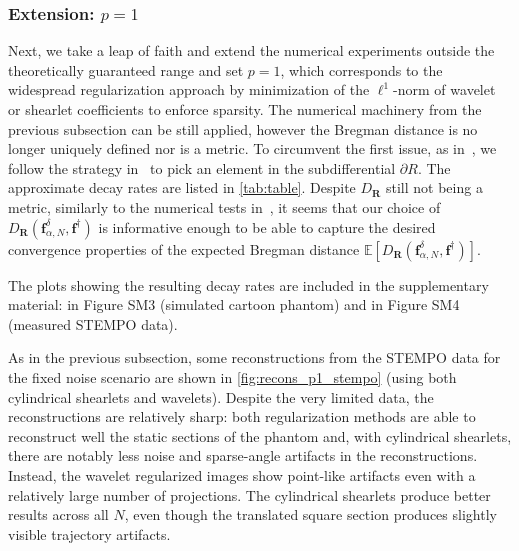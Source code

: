 \documentclass[11pt,a4paper]{article}
\numberwithin{equation}{section}
\renewcommand{\vec}[1]{\boldsymbol{#1}} %
\newcommand{\f}{\vec{f}} %
\newcommand{\faNd}{\f_{\alpha,N}^{\delta}} %
\newcommand{\E}{\mathbb{E}}
\begin{document}
\subsubsection{Extension: \texorpdfstring{$p = 1$}{p = 1}}
Next, we take a leap of faith and extend the numerical experiments outside the theoretically guaranteed range and set $p = 1$, which corresponds to the widespread regularization approach by minimization of the $\ell^1$-norm of wavelet or shearlet coefficients to enforce sparsity. The numerical machinery from the previous subsection can be still applied, however the Bregman distance is no longer uniquely defined nor is a metric. To circumvent the first issue, as in~\cite{Bubba22}, we follow the strategy in~\cite{burger2007error} to pick an element in the subdifferential $\partial R$. 
The approximate decay rates are listed in \cref{tab:table}.
Despite $D_{\vec{R}}$ still not being a metric, similarly to the numerical tests in~\cite{Bubba22}, it seems that our choice of $D_{\vec{R}}(\faNd, \f^\dag)$
is informative enough to be able to capture the desired convergence properties of the expected Bregman distance $\E \left[D_{\vec{R}}(\faNd, \f^\dag) \right]$. 

The plots showing the resulting decay rates are included in the supplementary material: in Figure SM3 %
(simulated cartoon phantom) and  in Figure SM4
(measured STEMPO data).

As in the previous subsection, some reconstructions  from the STEMPO data for the fixed noise scenario are shown in \cref{fig:recons_p1_stempo} 
(using both cylindrical shearlets and wavelets). 
Despite the very limited data, the reconstructions are relatively sharp: both regularization methods are able to reconstruct well the static sections of the phantom and,
with cylindrical shearlets, there are notably less noise and sparse-angle artifacts in the reconstructions.
Instead, the wavelet regularized images show point-like artifacts even with a relatively large number of projections. The cylindrical shearlets produce better results across all $N$, even though the translated square section produces slightly visible trajectory artifacts.
\end{document}
